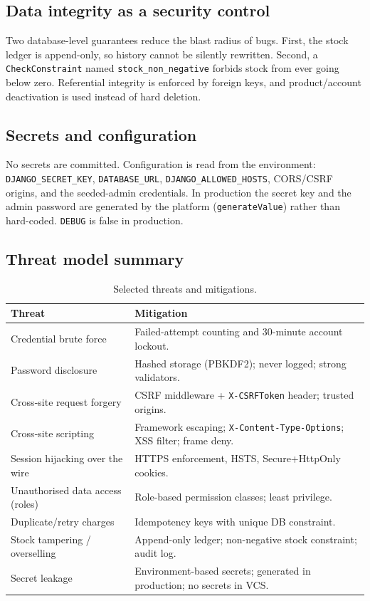 \documentclass[11pt,a4paper]{article}
\begin{document}
\subsection{Data integrity as a security control}

Two database-level guarantees reduce the blast radius of bugs. First, the stock ledger is append-only,
so history cannot be silently rewritten. Second, a \texttt{CheckConstraint} named
\texttt{stock\_non\_negative} forbids stock from ever going below zero. Referential integrity is
enforced by foreign keys, and product/account deactivation is used instead of hard deletion.

\subsection{Secrets and configuration}

No secrets are committed. Configuration is read from the environment: \texttt{DJANGO\_SECRET\_KEY},
\texttt{DATABASE\_URL}, \texttt{DJANGO\_ALLOWED\_HOSTS}, CORS/CSRF origins, and the seeded-admin
credentials. In production the secret key and the admin password are generated by the platform
(\texttt{generateValue}) rather than hard-coded. \texttt{DEBUG} is false in production.

\subsection{Threat model summary}

\begin{table}[htbp]\centering
\small
\caption{Selected threats and mitigations.}
\begin{tabular}{@{}p{}p{}@{}}
\toprule
\textbf{Threat} & \textbf{Mitigation} \\
\midrule
Credential brute force & Failed-attempt counting and 30-minute account lockout. \\
Password disclosure & Hashed storage (PBKDF2); never logged; strong validators. \\
Cross-site request forgery & CSRF middleware + \texttt{X-CSRFToken} header; trusted origins. \\
Cross-site scripting & Framework escaping; \texttt{X-Content-Type-Options}; XSS filter; frame deny. \\
Session hijacking over the wire & HTTPS enforcement, HSTS, Secure+HttpOnly cookies. \\
Unauthorised data access (roles) & Role-based permission classes; least privilege. \\
Duplicate/retry charges & Idempotency keys with unique DB constraint. \\
Stock tampering / overselling & Append-only ledger; non-negative stock constraint; audit log. \\
Secret leakage & Environment-based secrets; generated in production; no secrets in VCS. \\
\bottomrule
\end{tabular}
\end{table}
\end{document}

